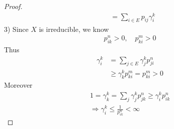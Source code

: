\documentclass[a4paper,11pt]{book}
\theoremstyle{definition}
\theoremstyle{remark}
\begin{document}
\begin{proof}
\begin{align*}
		&= \sum_{i \in E} p_{ij} \gamma_i^k
	\end{align*}
	3)
	Since $X$ is irreducible, we know
	\begin{align*}
		p_{ik}^n > 0, \quad p_{ki}^m > 0
	\end{align*}
	Thus
	\begin{align*}
		\gamma_i^k &= \sum_{j \in E} \gamma_j^k p_{ji}^n \\
		&\ge \gamma_k^k p_{ki}^m = p_{ki}^m > 0
	\end{align*}
	Moreover
	\begin{align*}
		1 = \gamma_k^k = \sum_j \gamma_j^k p_{jk}^n \ge \gamma_i^k p_{ik}^n\\
		\Rightarrow \gamma_i^k \le \frac{1}{p_{ik}^n}< \infty
	\end{align*}
\end{proof}
\end{document}
